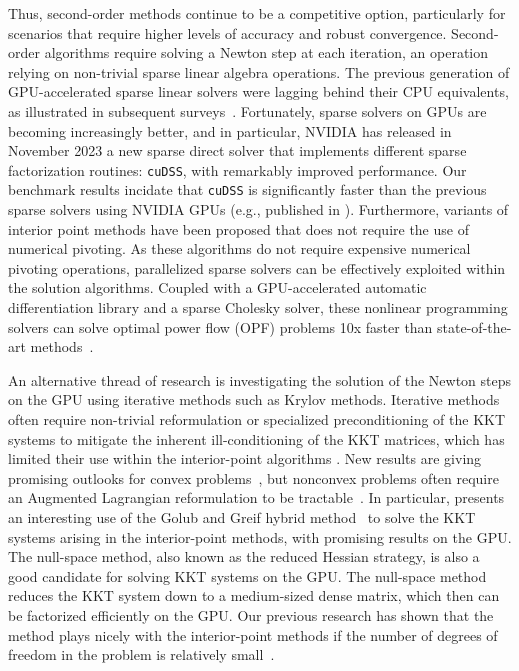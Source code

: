 Thus, second-order methods continue to be a competitive option, particularly
for scenarios that require higher levels of accuracy and robust convergence.
Second-order algorithms require solving a Newton step at each
iteration, an operation relying on non-trivial sparse linear algebra operations.
The previous generation of GPU-accelerated sparse linear
solvers were lagging behind their CPU equivalents, as illustrated in
subsequent surveys~\cite{tasseff2019exploring,swirydowicz2021linear}.
Fortunately, sparse solvers on GPUs are becoming increasingly better, and in particular, NVIDIA has released in November 2023
a new sparse direct solver that implements different sparse factorization routines: {\tt cuDSS}, with remarkably improved performance.
Our benchmark results incidate that {\tt cuDSS} is significantly faster than the previous sparse solvers using NVIDIA GPUs (e.g., published in \cite{shin2023accelerating}).
Furthermore, variants of interior point methods have been proposed
that does not require the use of numerical pivoting.
As these algorithms do not require expensive numerical pivoting
operations, parallelized sparse solvers can be effectively exploited
within the solution algorithms.
Coupled with a GPU-accelerated automatic differentiation library and a
sparse Cholesky solver, these nonlinear programming solvers can solve
optimal power flow (OPF) problems 10x faster than state-of-the-art
methods~\cite{shin2023accelerating}.

An alternative thread of research is investigating the solution of the Newton steps
on the GPU using iterative methods such as Krylov methods.
Iterative methods often require non-trivial reformulation or
specialized preconditioning of the KKT systems to mitigate the
inherent ill-conditioning of the KKT matrices, which has limited their
use within the interior-point algorithms
\cite{curtisNoteImplementationInteriorpoint2012,rodriguezScalablePreconditioningBlockstructured2020}.
New results are giving promising outlooks for convex problems~\cite{ghannad2022linear},
but nonconvex problems often require an Augmented Lagrangian reformulation
to be tractable~\cite{cao2016augmented,regev2023hykkt}. In particular,
\cite{regev2023hykkt} presents an interesting use of the Golub and Greif
hybrid method~\cite{golub2003solving} to solve the KKT systems arising in
the interior-point methods, with promising results on the GPU.
The null-space method, also known as the reduced Hessian strategy,
is also a good candidate for solving KKT systems on the GPU.
The null-space method reduces the KKT system down to
a medium-sized dense matrix, which then can be factorized efficiently on the GPU.
Our previous research has shown that the method plays nicely with the interior-point
methods if the number of degrees of freedom in the problem is relatively small~\cite{pacaud2022condensed}.

